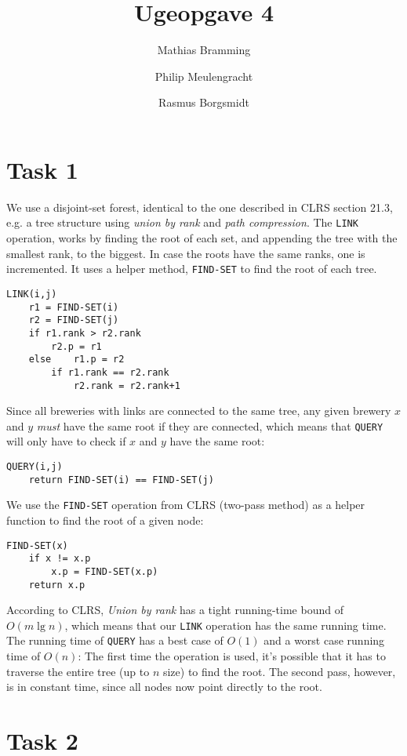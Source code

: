 \documentclass[paper=a4, fleqn]{article}
\title{Ugeopgave 4}
\author{Mathias Bramming \and Philip Meulengracht \and Rasmus Borgsmidt}
\date{}
\begin{document}
\maketitle
\section*{Task 1} 

We use a disjoint-set forest, identical to the one described in CLRS section
21.3, e.g. a tree structure using \emph{union by rank} and \emph{path
  compression}. The {\tt LINK} operation, works by finding the root of each set,
and appending the tree with the smallest rank, to the biggest. In case the roots
have the same ranks, one is incremented. It uses a helper method,
{\tt FIND-SET} to find the root of each tree.

\begin{lstlisting}
LINK(i,j)
	r1 = FIND-SET(i)
	r2 = FIND-SET(j)
	if r1.rank > r2.rank
		r2.p = r1
	else 	r1.p = r2
		if r1.rank == r2.rank
			r2.rank = r2.rank+1
\end{lstlisting}

Since all breweries with links are connected to the same tree, any given brewery
$x$ and $y$ \emph{must} have the same root if they are connected, which means
that {\tt QUERY} will only have to check if $x$ and $y$ have the same root:

\begin{lstlisting}
QUERY(i,j)
	return FIND-SET(i) == FIND-SET(j)
\end{lstlisting}

We use the {\tt FIND-SET} operation from CLRS (two-pass method) as a helper
function to find the root of a given node:

\begin{lstlisting}
FIND-SET(x)
	if x != x.p
		x.p = FIND-SET(x.p)
	return x.p
\end{lstlisting}

According to CLRS, \emph{Union by rank} has a tight running-time bound of $O(m
\lg n)$, which means that our {\tt LINK} operation has the same running
time. The running time of {\tt QUERY} has a best case of $O(1)$ and a worst
case running time of $O(n)$: The first time the operation is used, it's possible
that it has to traverse the entire tree (up to $n$ size) to find the root. The
second pass, however, is in constant time, since all nodes now point directly to
the root.

\section*{Task 2}
\end{document}
